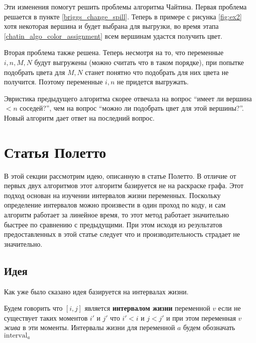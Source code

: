 Эти изменения помогут решить проблемы алгоритма Чайтина. Первая проблема решается в пункте \ref{briggs_change_spill}.
Теперь в примере с рисунка \ref{fig:ex2} хотя некоторая вершина и будет выбрана для выгрузки, во время этапа \ref{chatin_algo_color_assignment}
всем вершинам удастся получить цвет.

Вторая проблема также решена. Теперь несмотря на то, что переменные $i, n, M, N$ будут выгружены (можно считать что в таком
порядке), при попытке подобрать цвета для $M, N$ станет понятно что подобрать для них цвета не получится.
Поэтому переменные $i, n$ не придется выгружать.

Эвристика предыдущего алгоритма скорее отвечала на
вопрос ``имеет ли вершина $< n$ соседей?'', чем на вопрос ``можно ли подобрать цвет для этой вершины?''. Новый
алгоритм дает ответ на последний вопрос.

\section{Статья Полетто}

В этой секции рассмотрим идею, описанную в статье Полетто. В отличие от первых двух алгоритмов
этот алгоритм базируется не на раскраске графа. Этот подход основан на изучении интервалов жизни
переменных. Поскольку определение интервалов можно произвести в один проход по коду, и сам алгоритм
работает за линейное время, то этот метод работает значительно быстрее по сравнению с предыдущими.
При этом исходя из результатов предоставленных в этой статье следует что и производительность
страдает не значительно.

\subsection{Идея}

Как уже было сказано идея базируется на интервалах жизни.

\begin{definition}
    Будем говорить что $[i, j]$ является \textbf{интервалом жизни} переменной $v$ если не существует таких
    моментов $i'$ и $j'$ что $i' < i$ и $j < j'$ и при этом переменная $v$ \textit{жива} в эти моменты.
    Интервалы жизни для переменной $a$ будем обозначать $\text{interval}_a$
\end{definition}

